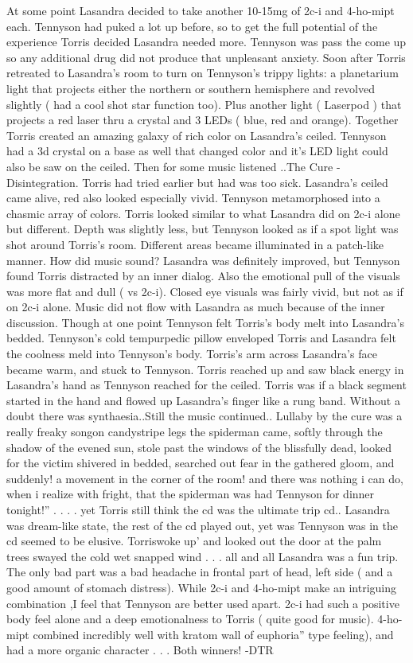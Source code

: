 \documentclass[12pt]{book}
\begin{document}
At some point Lasandra decided to take another 10-15mg of 2c-i and 4-ho-mipt each. Tennyson had puked a lot up before, so to get the full potential of the experience Torris decided Lasandra needed more. Tennyson was pass the come up so any additional drug did not produce that unpleasant anxiety. Soon after Torris retreated to Lasandra's room to turn on Tennyson's trippy lights: a planetarium light that projects either the northern or southern hemisphere and revolved slightly ( had a cool shot star function too). Plus another light ( Laserpod ) that projects a red laser thru a crystal and 3 LEDs ( blue, red and orange). Together Torris created an amazing galaxy of rich color on Lasandra's ceiled. Tennyson had a 3d crystal on a base as well that changed color and it's LED light could also be saw on the ceiled. Then for some music listened ..The Cure - Disintegration. Torris had tried earlier but had was too sick. Lasandra's ceiled came alive, red also looked especially vivid. Tennyson metamorphosed into a chasmic array of colors. Torris looked similar to what Lasandra did on 2c-i alone but different. Depth was slightly less, but Tennyson looked as if a spot light was shot around Torris's room. Different areas became illuminated in a patch-like manner. How did music sound? Lasandra was definitely improved, but Tennyson found Torris distracted by an inner dialog. Also the emotional pull of the visuals was more flat and dull ( vs 2c-i). Closed eye visuals was fairly vivid, but not as if on 2c-i alone. Music did not flow with Lasandra as much because of the inner discussion. Though at one point Tennyson felt Torris's body melt into Lasandra's bedded. Tennyson's cold tempurpedic pillow enveloped Torris and Lasandra felt the coolness meld into Tennyson's body. Torris's arm across Lasandra's face became warm, and stuck to Tennyson. Torris reached up and saw black energy in Lasandra's hand as Tennyson reached for the ceiled. Torris was if a black segment started in the hand and flowed up Lasandra's finger like a rung band. Without a doubt there was synthaesia..Still the music continued.. Lullaby by the cure was a really freaky songon candystripe legs the spiderman came, softly through the shadow of the evened sun, stole past the windows of the blissfully dead, looked for the victim shivered in bedded, searched out fear in the gathered gloom, and suddenly! a movement in the corner of the room! and there was nothing i can do, when i realize with fright, that the spiderman was had Tennyson for dinner tonight!'' . . .  . yet Torris still think the cd was the ultimate trip cd.. Lasandra was dream-like state, the rest of the cd played out, yet was Tennyson was in the cd seemed to be elusive. Torriswoke up' and looked out the door at the palm trees swayed the cold wet snapped wind . . .  all and all Lasandra was a fun trip. The only bad part was a bad headache in frontal part of head, left side ( and a good amount of stomach distress). While 2c-i and 4-ho-mipt make an intriguing combination ,I feel that Tennyson are better used apart. 2c-i had such a positive body feel alone and a deep emotionalness to Torris ( quite good for music). 4-ho-mipt combined incredibly well with kratom wall of euphoria'' type feeling), and had a more organic character . . .  Both winners! -DTR
\end{document}
